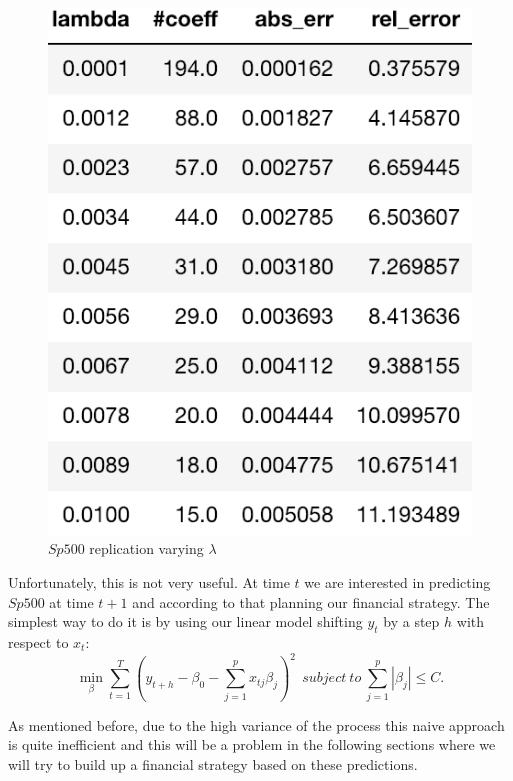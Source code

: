 \documentclass{article}%
\begin{document}
\begin{figure}[h!]
  \centering
  \includegraphics[scale=0.6]{err_lambda.png}
  \caption{$Sp500$ replication varying $\lambda$}
  \label{err_alpha}
\end{figure}

Unfortunately, this is not very useful. At time $t$ we are interested in predicting $Sp500$ at time $t+1$ and according to that planning our financial strategy. The simplest way to do it is by using our linear model shifting $y_t$ by a step $h$ with respect to $x_t$:
\begin{equation}
 \min_{\beta} \sum_{t=1}^T ( y_{t+h} -\beta_0 -\sum_{j=1}^p x_{tj} \beta_j)^2 ~~subject~to~\sum_{j=1}^p |\beta_j| \leq C.
\end{equation}

As mentioned before, due to the high variance of the process this naive approach is quite inefficient and this will be a problem in the following sections where we will try to build up a financial strategy based on these predictions.
\end{document}
